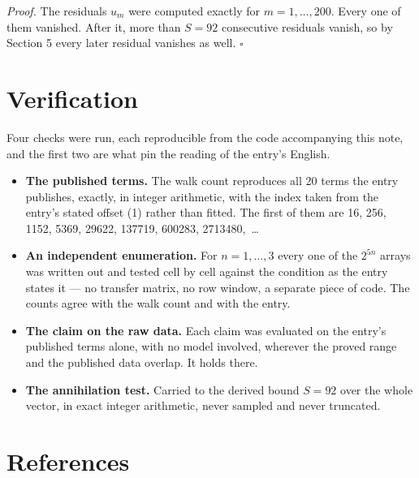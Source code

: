 \documentclass[11pt]{article}
\theoremstyle{definition}
\begin{document}
{\itshape Proof.} The residuals $u_m$ were computed exactly for $m = 1,\dots,200$. Every one of them vanished. After it, more than $S = 92$ consecutive residuals vanish, so by Section 5 every later residual vanishes as well. $\square$

\section{Verification}

Four checks were run, each reproducible from the code accompanying this note, and the first two are what pin the reading of the entry's English.

\begin{itemize}

\item {\bfseries The published terms.} The walk count reproduces all 20 terms the entry publishes, exactly, in integer arithmetic, with the index taken from the entry's stated offset (1) rather than fitted. The first of them are 16, 256, 1152, 5369, 29622, 137719, 600283, 2713480,~\dots

\item {\bfseries An independent enumeration.} For $n = 1,\dots,3$ every one of the $2^{5n}$ arrays was written out and tested cell by cell against the condition as the entry states it --- no transfer matrix, no row window, a separate piece of code. The counts agree with the walk count and with the entry.

\item {\bfseries The claim on the raw data.} Each claim was evaluated on the entry's published terms alone, with no model involved, wherever the proved range and the published data overlap. It holds there.

\item {\bfseries The annihilation test.} Carried to the derived bound $S = 92$ over the whole vector, in exact integer arithmetic, never sampled and never truncated.

\end{itemize}

\section{References}
\end{document}
